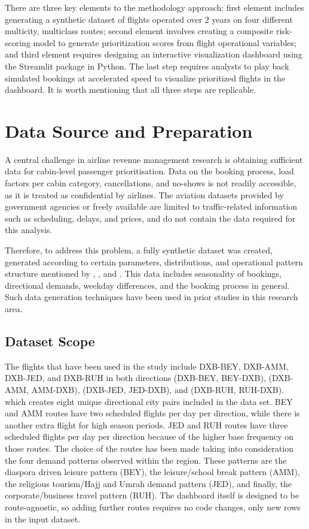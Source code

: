 There are three key elements to the methodology approach: first element includes generating a synthetic dataset of flights operated over 2 years on four different multicity, multiclass routes; second element involves creating a composite risk-scoring model to generate prioritization scores from flight operational variables; and third element requires designing an interactive visualization dashboard using the Streamlit package in Python. The last step requires analysts to play back simulated bookings at accelerated speed to visualize prioritized flights in the dashboard. It is worth mentioning that all three steps are replicable.

\section{Data Source and Preparation}

A central challenge in airline revenue management research is obtaining sufficient data for cabin-level passenger prioritisation. Data on the booking process, load factors per cabin category, cancellations, and no-shows is not readily accessible, as it is treated as confidential by airlines. The aviation datasets provided by government agencies or freely available are limited to traffic-related information such as scheduling, delays, and prices, and do not contain the data required for this analysis.

Therefore, to address this problem, a fully synthetic dataset was created, generated according to certain parameters, distributions, and operational pattern structure mentioned by \citet{Belobaba1987, Belobaba1989}, \citet{LeeHersh1993}, and \citet{PakPiersma2002}. This data includes seasonality of bookings, directional demands, weekday differences, and the booking process in general. Such data generation techniques have been used in prior studies in this research area.

\subsection{Dataset Scope}

The flights that have been used in the study include DXB-BEY, DXB-AMM, DXB-JED, and DXB-RUH in both directions (DXB-BEY, BEY-DXB), (DXB-AMM, AMM-DXB), (DXB-JED, JED-DXB), and (DXB-RUH, RUH-DXB). which creates eight unique directional city pairs included in the data set. BEY and AMM routes have two scheduled flights per day per direction, while there is another extra flight for high season periods. JED and RUH routes have three scheduled flights per day per direction because of the higher base frequency on those routes. The choice of the routes has been made taking into consideration the four demand patterns observed within the region. These patterns are the diaspora driven leisure pattern (BEY), the leisure/school break pattern (AMM), the religious tourism/Hajj and Umrah demand pattern (JED), and finally, the corporate/business travel pattern (RUH). The dashboard itself is designed to be route-agnostic, so adding further routes requires no code changes, only new rows in the input dataset.

